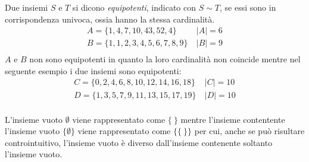 Due insiemi $S$ e $T$ si dicono \textit{equipotenti}, indicato con $S \sim T$, se
essi sono in corrispondenza univoca, ossia hanno la stessa cardinalità.
\begin{equation*}
\begin{split}
A = \{ 1,4,7,10,43,52,4 \} & \ |A| = 6 \\
B = \{1,1,2,3,4,5,6,7,8,9 \} & \ |B| = 9 \\
\end{split}
\end{equation*}
$A$ e $B$ non sono equipotenti in quanto la loro cardinalità non coincide mentre
nel seguente esempio i due insiemi sono equipotenti:
\begin{equation*}
\begin{split}
C = \{0,2,4,6,8,10,12,14,16,18\} & \ |C| = 10 \\
D = \{1,3,5,7,9,11,13,15,17,19\} & \ |D| = 10 \\
\end{split}
\end{equation*}


L'insieme vuoto $\emptyset$ viene rappresentato come $\{ \ \}$ mentre l'insieme contentente
l'insieme vuoto $\{ \emptyset \}$ viene rappresentato come $\{ \{ \ \} \}$ per cui,
anche se può risultare controintuitivo, l'insieme vuoto è diverso dall'insieme
contenente soltanto l'insieme vuoto.

